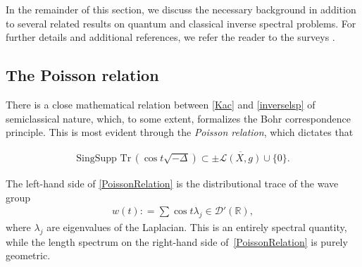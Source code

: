 \documentclass[11pt,letterpaper,oneside]{amsart}
\newcommand{\R}{\mathbb{R}}
\theoremstyle{definition}
\theoremstyle{remark}
\newcommand{\tr}{\text{Tr}\,}
\theoremstyle{definition}
\theoremstyle{remark}
\newcommand{\CL}{\mathcal{L}}
\begin{document}
\medskip

In the remainder of this section, we discuss the necessary background in addition to several related results on quantum and classical inverse spectral problems. For further details and additional references, we refer the reader to the surveys \cite{ZelditchSurvey2, datchev2011inverse}. 

\subsection{The Poisson relation}

There is a close mathematical relation between \eqref{Kac} and \eqref{inverselsp} of semiclassical nature, which, to some extent, formalizes the Bohr correspondence principle. This is most evident through the \textit{Poisson relation}, which dictates that

\begin{align}\label{PoissonRelation}
	\text{SingSupp} \,\,\tr \left(\cos t \sqrt{- \Delta}\right) \subset \pm \overline{\CL(X,g)} \cup \{0\}.
\end{align}

The left-hand side of \eqref{PoissonRelation} is the distributional trace of the wave group
\begin{align}\label{eq:wave trace}
	w(t): = \sum \cos t \lambda_j \in \mathcal{D}'(\R),
\end{align}
where $\lambda_j$ are eigenvalues of the Laplacian. This is an entirely spectral quantity, while the length spectrum on the right-hand side of~\eqref{PoissonRelation} is purely geometric.

\medskip
\end{document}
